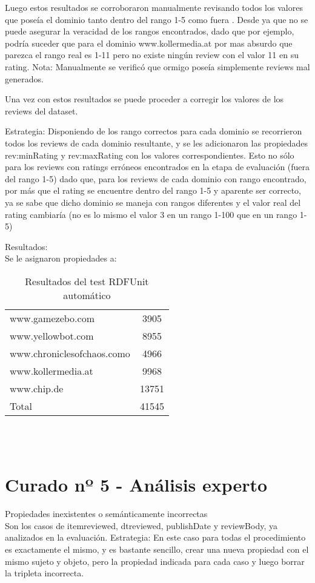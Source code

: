 Luego estos resultados se corroboraron manualmente revisando todos los valores que poseía el dominio tanto dentro del rango 1-5 como fuera .
Desde ya que no se puede asegurar la veracidad de los rangos encontrados, dado que por ejemplo, podría suceder que para el dominio 
www.kollermedia.at por mas absurdo que parezca el rango real es 1-11 pero no existe ningún review con el valor 11 en su rating.
Nota: Manualmente se verificó que ormigo poseía simplemente reviews mal generados.

Una vez con estos resultados se puede proceder a corregir los valores de los reviews del dataset.

Estrategia:
Disponiendo de los rango correctos para cada dominio se recorrieron todos los reviews de cada dominio resultante, y se les adicionaron 
las propiedades rev:minRating y rev:maxRating con los valores correspondientes.
Esto no sólo para los reviews con ratings erróneos encontrados en la etapa de evaluación (fuera del rango 1-5) dado que, para los reviews de 
cada dominio con rango encontrado, por más que el rating se encuentre dentro del rango 1-5 y aparente ser correcto,  ya se sabe que dicho dominio se 
maneja con rangos diferentes y el valor real del rating cambiaría (no es lo mismo el valor 3 en un rango 1-100 que en un rango 1-5)

Resultados:\\
Se le asignaron propiedades a:\\
\begin{table}[h]
\begin{tabular}{| l | c |}
 www.gamezebo.com & 3905\\
 www.yellowbot.com & 8955\\
 www.chroniclesofchaos.como & 4966\\
 www.kollermedia.at & 9968\\
 www.chip.de & 13751\\
 Total & 41545
\end{tabular}
\caption{Resultados del test RDFUnit automático}
\label{table:RDFUnitAutomatic}
\end{table}\\
\\
\section{Curado nº 5 - Análisis experto}
\label{section:curado-analisis}
Propiedades inexistentes o semánticamente incorrectas\\
Son los casos de itemreviewed, dtreviewed, publishDate y reviewBody, ya analizados en la evaluación.
Estrategia: En este caso para todas el procedimiento es exactamente el mismo, y es bastante sencillo, crear una nueva propiedad con 
el mismo sujeto y objeto, pero la propiedad indicada para cada caso y luego borrar la tripleta incorrecta.\\

